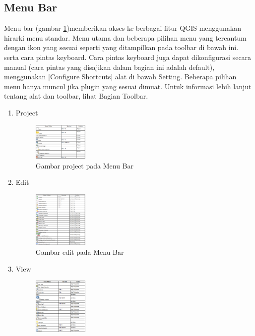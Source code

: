 \subsection{Menu Bar}
Menu bar (gambar \ref{menubar})memberikan akses ke berbagai fitur QGIS menggunakan hirarki menu standar. Menu utama dan beberapa pilihan menu yang tercantum dengan ikon yang sesuai seperti yang ditampilkan pada toolbar di bawah ini. serta cara pintas keyboard. Cara pintas keyboard juga dapat dikonfigurasi secara manual (cara pintas yang disajikan dalam bagian ini adalah default), menggunakan [Configure Shortcuts] alat di bawah Setting. Beberapa pilihan menu hanya muncul jika plugin yang sesuai dimuat. Untuk informasi lebih lanjut tentang alat dan toolbar, lihat Bagian Toolbar. 
\begin{enumerate}
\item
Project
\begin{figure}[ht]
    \centerline{\includegraphics[width=0.25\textwidth]{figures/menubar}}
    \caption{Gambar project pada Menu Bar}
    \label{menubar}
    \end{figure}
\item
Edit
\begin{figure}[ht]
    \centerline{\includegraphics[width=0.25\textwidth]{figures/menubar1}}
    \caption{Gambar edit pada Menu Bar}
    \label{menubar1}
    \end{figure}
\item
View
\begin{figure}[ht]
    \centerline{\includegraphics[width=0.25\textwidth]{figures/menubar2}}

\end{figure}
\end{enumerate}
